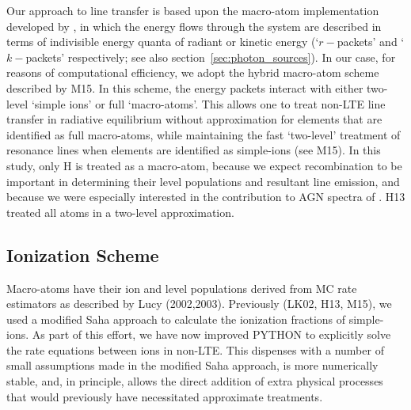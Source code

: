 \documentclass[useAMS,usenatbib]{mn2e_x}
\begin{document}
Our approach to line transfer is based upon the macro-atom implementation developed by 
\cite{lucy2002, lucy2003}, in which the energy flows through the system are described in 
terms of indivisible energy quanta of radiant or kinetic energy 
(`$r-$packets' and `$k-$packets' respectively; see also section~\ref{sec:photon_sources}). 
In our case, for reasons of computational efficiency, we adopt the  hybrid macro-atom scheme 
described by M15.
In this scheme, the energy packets interact with either two-level `simple ions' 
or full `macro-atoms'. This allows one to treat non-LTE line transfer in radiative equilibrium
without approximation for elements that are identified as 
full macro-atoms, while maintaining the fast `two-level' 
treatment of resonance lines when elements are identified 
as simple-ions (see M15). In this study,
only H is treated as a macro-atom, because 
we expect recombination to be important
in determining their level populations and resultant line emission, and because we were especially interested in the contribution to AGN spectra of \LA.  
H13 treated all atoms in a two-level approximation.

\subsection{Ionization Scheme}

Macro-atoms have their ion and level populations derived from
MC rate estimators as described by Lucy (2002,2003). Previously (LK02, H13, M15),
we used a modified Saha approach to calculate the ionization fractions
of simple-ions. As part of  this effort, we have now improved {\sc PYTHON} to explicitly solve the 
rate equations between ions in non-LTE. This dispenses with a number of small assumptions 
made in the modified Saha approach, is more numerically stable, and, in principle, allows 
the direct addition of extra physical processes that would previously have necessitated 
approximate treatments.
\end{document}
